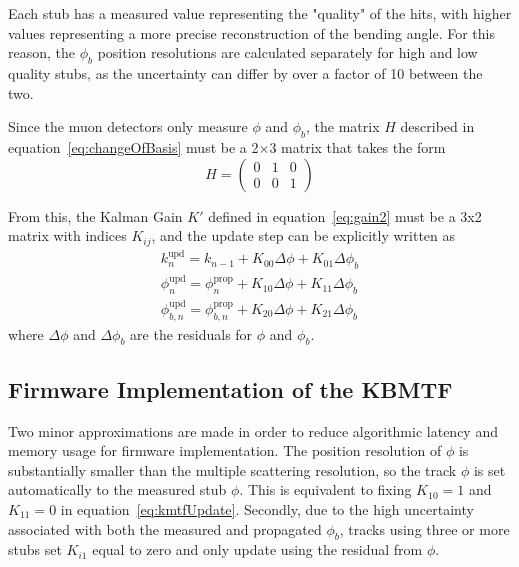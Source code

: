 Each stub has a measured value representing the "quality" of the hits, with higher values representing a more precise reconstruction of the bending angle. For this reason, the $\phi_b$ position resolutions are calculated separately for high and low quality stubs, as the uncertainty can differ by over a factor of 10 between the two. 

Since the muon detectors only measure $\phi$ and $\phi_b$, the matrix $H$ described in equation~\ref{eq:changeOfBasis} must be a 2$\times$3 matrix that takes the form
\begin{equation}
	H=\left(\begin{matrix}
		0 & 1 & 0\\
		0 & 0 & 1\end{matrix}\right)
\end{equation}

From this, the Kalman Gain $K'$ defined in equation~\ref{eq:gain2} must be a 3x2 matrix with indices $K_{ij}$, and the update step can be explicitly written as
\begin{equation} \label{eq:kmtfUpdate}
	\begin{split}
		k_n^\mathrm{upd}=k_{n-1}+K_{00}\Delta\phi+K_{01}\Delta\phi_b \\
		\phi_n^\mathrm{upd}=\phi_n^\mathrm{prop}+K_{10}\Delta\phi+K_{11}\Delta\phi_b \\
		\phi_{b,n}^\mathrm{upd}=\phi_{b,n}^\mathrm{prop}+K_{20}\Delta\phi+K_{21}\Delta\phi_b
	\end{split}
\end{equation}
where $\Delta\phi$ and $\Delta\phi_b$ are the residuals for $\phi$ and $\phi_b$.

\subsection{Firmware Implementation of the KBMTF} \label{sec:fw}

Two minor approximations are made in order to reduce algorithmic latency and memory usage for firmware implementation. The position resolution of $\phi$ is substantially smaller than the multiple scattering resolution, so the track $\phi$ is set automatically to the measured stub $\phi$. This is equivalent to fixing $K_{10}=1$ and $K_{11}=0$ in equation~\ref{eq:kmtfUpdate}. Secondly, due to the high uncertainty associated with both the measured and propagated $\phi_b$, tracks using three or more stubs set $K_{i1}$ equal to zero and only update using the residual from $\phi$.

